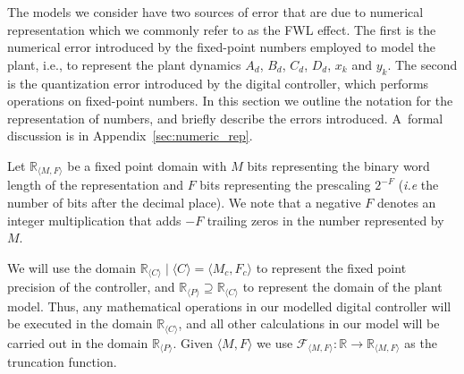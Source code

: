 \documentclass[sigconf]{llncs}
\begin{document}
The models we consider have two sources of error that are due to numerical  
representation which we commonly refer to as the FWL effect.
The first is the numerical error introduced by the
fixed-point numbers employed to model the plant, i.e., to represent the
plant dynamics $A_d$, $B_d$, $C_d$, $D_d$, $x_k$ and $y_k$.
The second is the quantization error
introduced by the digital controller, which performs operations on
fixed-point numbers.  In this section we outline the notation for the
representation of numbers, and briefly describe the errors
introduced.  A~formal discussion is in
Appendix~\ref{sec:numeric_rep}.

Let $\mathbb{R}_{\langle M,F \rangle}$ be a fixed point domain with $M$ bits
representing the binary word length of the representation and $F$ bits
representing the prescaling $2^{-F}$ (\emph{i.e} the number of bits after
the decimal place).  We note that a negative $F$ denotes an integer
multiplication that adds $-F$ trailing zeros in the number represented by
$M$.

We will use the domain $\mathbb{R}_{\langle C \rangle} \mid \langle C \rangle = \langle M_c,F_c \rangle$
to represent the fixed point precision of the controller, and 
$\mathbb{R}_{\langle P \rangle} \supseteq \mathbb{R}_{\langle C \rangle}$
to represent the domain of the plant model.
Thus, any mathematical operations in our modelled digital controller will be executed in the
domain $\mathbb{R}_{\langle C \rangle}$, and all other calculations
in our model will be carried out in the domain $\mathbb{R}_{\langle P \rangle}$.
Given ${\langle M,F \rangle}$ we use $\mathcal{F}_{\langle M,F \rangle} : \mathbb{R} \rightarrow \mathbb{R}_{\langle M,F \rangle}$ as the truncation function.

\end{document}
